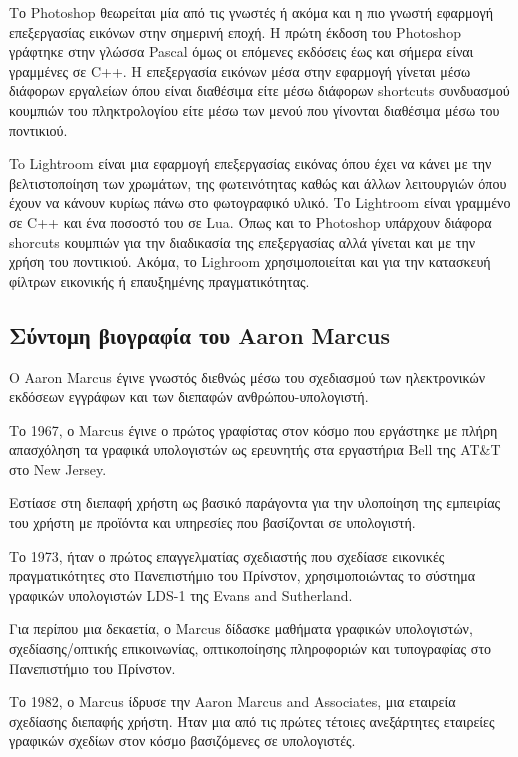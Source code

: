 \documentclass[
]{article}
\begin{document}
Το Photoshop θεωρείται μία από τις γνωστές ή ακόμα και η πιο γνωστή
εφαρμογή επεξεργασίας εικόνων στην σημερινή εποχή. Η πρώτη έκδοση του
Photoshop γράφτηκε στην γλώσσα Pascal όμως οι επόμενες εκδόσεις έως και
σήμερα είναι γραμμένες σε C++. Η επεξεργασία εικόνων μέσα στην εφαρμογή
γίνεται μέσω διάφορων εργαλείων όπου είναι διαθέσιμα είτε μέσω διάφορων
shortcuts συνδυασμού κουμπιών του πληκτρολογίου είτε μέσω των μενού που
γίνονται διαθέσιμα μέσω του ποντικιού.

To Lightroom είναι μια εφαρμογή επεξεργασίας εικόνας όπου έχει να κάνει
με την βελτιστοποίηση των χρωμάτων, της φωτεινότητας καθώς και άλλων
λειτουργιών όπου έχουν να κάνουν κυρίως πάνω στο φωτογραφικό υλικό. Το
Lightroom είναι γραμμένο σε C++ και ένα ποσοστό του σε Lua. Όπως και το
Photoshop υπάρχουν διάφορα shorcuts κουμπιών για την διαδικασία της
επεξεργασίας αλλά γίνεται και με την χρήση του ποντικιού. Ακόμα, το
Lighroom χρησιμοποιείται και για την κατασκευή φίλτρων εικονικής ή
επαυξημένης πραγματικότητας.

\hypertarget{ux3c3ux3cdux3bdux3c4ux3bfux3bcux3b7-ux3b2ux3b9ux3bfux3b3ux3c1ux3b1ux3c6ux3afux3b1-ux3c4ux3bfux3c5-aaron-marcus}{%
\subsection{Σύντομη βιογραφία του Aaron
Marcus}\label{ux3c3ux3cdux3bdux3c4ux3bfux3bcux3b7-ux3b2ux3b9ux3bfux3b3ux3c1ux3b1ux3c6ux3afux3b1-ux3c4ux3bfux3c5-aaron-marcus}}

Ο Aaron Marcus έγινε γνωστός διεθνώς μέσω του σχεδιασμού των
ηλεκτρονικών εκδόσεων εγγράφων και των διεπαφών ανθρώπου-υπολογιστή.

Το 1967, ο Marcus έγινε ο πρώτος γραφίστας στον κόσμο που εργάστηκε με
πλήρη απασχόληση τα γραφικά υπολογιστών ως ερευνητής στα εργαστήρια Bell
της AT\&T στο New Jersey.

Εστίασε στη διεπαφή χρήστη ως βασικό παράγοντα για την υλοποίηση της
εμπειρίας του χρήστη με προϊόντα και υπηρεσίες που βασίζονται σε
υπολογιστή.

Το 1973, ήταν ο πρώτος επαγγελματίας σχεδιαστής που σχεδίασε εικονικές
πραγματικότητες στο Πανεπιστήμιο του Πρίνστον, χρησιμοποιώντας το
σύστημα γραφικών υπολογιστών LDS-1 της Evans and Sutherland.

Για περίπου μια δεκαετία, ο Marcus δίδασκε μαθήματα γραφικών
υπολογιστών, σχεδίασης/οπτικής επικοινωνίας, οπτικοποίησης πληροφοριών
και τυπογραφίας στο Πανεπιστήμιο του Πρίνστον.

Το 1982, ο Marcus ίδρυσε την Aaron Marcus and Associates, μια εταιρεία
σχεδίασης διεπαφής χρήστη. Ήταν μια από τις πρώτες τέτοιες ανεξάρτητες
εταιρείες γραφικών σχεδίων στον κόσμο βασιζόμενες σε υπολογιστές.
\end{document}
